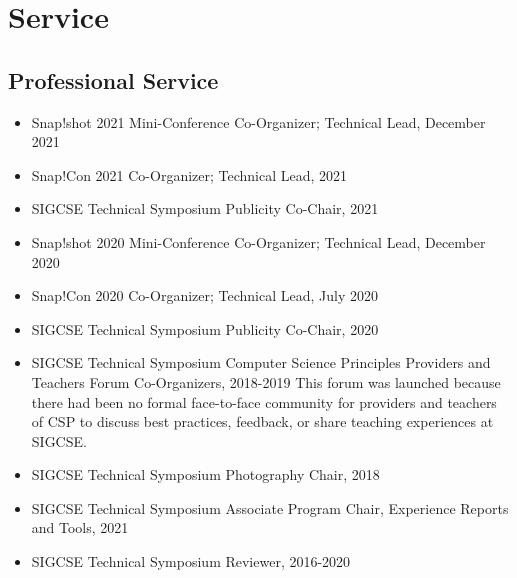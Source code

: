 \section{Service}

\vspace{6pt}

\subsection{Professional Service}

\vspace{5pt}

\begin{itemize}
 
  \setlength\itemsep{1em}
    
    \item{Snap!shot 2021 Mini-Conference Co-Organizer; Technical Lead, December 2021}
        
    \item{Snap!Con 2021 Co-Organizer; Technical Lead, 2021}
    
    \item{SIGCSE Technical Symposium Publicity Co-Chair, 2021}

    \item{Snap!shot 2020 Mini-Conference Co-Organizer; Technical Lead, December 2020}
        
    \item{Snap!Con 2020 Co-Organizer; Technical Lead, July 2020}
    
    \item{SIGCSE Technical Symposium Publicity Co-Chair, 2020}

    \item SIGCSE Technical Symposium Computer Science Principles Providers and Teachers Forum Co-Organizers, 2018-2019
    \newline
    \small This forum was launched because there had been no formal face-to-face community for providers and teachers of CSP to discuss best practices, feedback, or share teaching experiences at SIGCSE.
    
    \item{SIGCSE Technical Symposium Photography Chair, 2018}
    
    \item{SIGCSE Technical Symposium Associate Program Chair, Experience Reports and Tools, 2021}

    \item{SIGCSE Technical Symposium Reviewer, 2016-2020}
    
\end{itemize}

